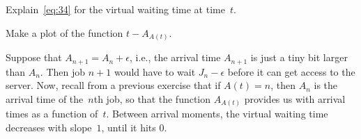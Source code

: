 \documentclass[stochastic-or.tex]{subfiles}
\begin{document}
\begin{exercise}\label{ex:l-150}
Explain~\cref{eq:34} for the virtual waiting time at time~$t$.
\begin{hint}Make a plot of the function $t-A_{A(t)}$.
\end{hint}
\begin{solution}
Suppose that $A_{n+1} = A_{n} + \epsilon$, i.e., the arrival time $A_{n+1}$ is just a tiny bit larger than $A_{n}$.
Then job $n+1$ would have to wait $J_{n}-\epsilon$ before it can get access to the server.
Now, recall from a previous exercise that if $A(t)=n$, then $A_n$ is the arrival time of the~$n$th job, so that the function $A_{A(t)}$ provides us with arrival times as a function of~$t$.
Between arrival moments, the virtual waiting time decreases with slope~$1$, until it hits 0.
\end{solution}
\end{exercise}







\end{document}
